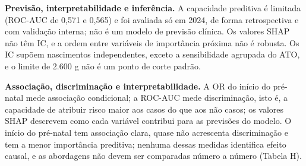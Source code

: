 \documentclass[10pt,a4paper]{article}
\begin{document}
{\color{iptescuro}\bfseries Previsão, interpretabilidade e inferência.} A capacidade preditiva é limitada (ROC-AUC de 0,571 e 0,565) e foi avaliada só em 2024, de forma retrospectiva e com validação interna; não é um modelo de previsão clínica. Os valores SHAP não têm IC, e a ordem entre variáveis de importância próxima não é robusta. Os IC supõem nascimentos independentes, exceto a sensibilidade agrupada do ATO, e o limite de 2.600 g não é um ponto de corte padrão.\par

{\color{iptescuro}\bfseries Associação, discriminação e interpretabilidade.} A OR do início do pré-natal mede associação condicional; a ROC-AUC mede discriminação, isto é, a capacidade de atribuir risco maior aos casos do que aos não casos; os valores SHAP descrevem como cada variável contribui para as previsões do modelo. O início do pré-natal tem associação clara, quase não acrescenta discriminação e tem a menor importância preditiva; nenhuma dessas medidas identifica efeito causal, e as abordagens não devem ser comparadas número a número (Tabela H).\par
\end{document}

